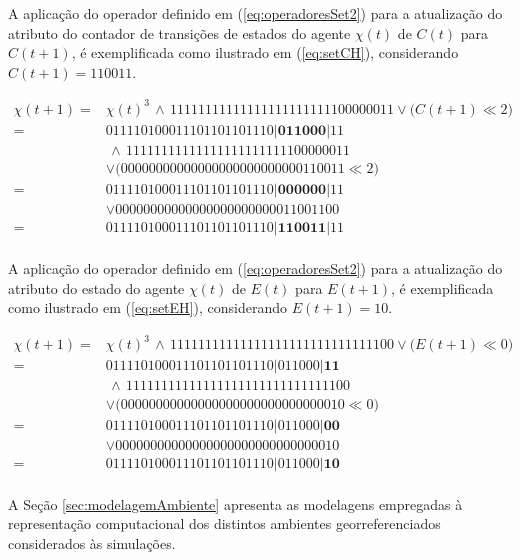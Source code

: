 A aplicação do operador definido em (\ref{eq:operadoresSet2}) para a atualização do atributo do contador de transições de estados do agente $\chi(t)$ de $C(t)$ para $C(t + 1)$, é exemplificada como ilustrado em (\ref{eq:setCH}), considerando $C(t + 1) = 1 1 0 0 1 1$.

\begin{equation}
 \begin{split}
 \chi(t + 1)   = & \chi(t)^3 \, \wedge \, 11111111111111111111111100000011 \vee \big(C(t + 1) \ll 2\big) \\
	       = & 0 1 1 1 1 0 1 0 0 0 1 1 1 0 1 1 0 1 1 0 1 1 1 0 | \boldsymbol{0 1 1 0 0 0} | 1 1 \\
	         & \, \wedge \, 11111111111111111111111100000011 \\
	         & \vee \big(00000000000000000000000000110011 \ll 2\big) \\
	       = & 0 1 1 1 1 0 1 0 0 0 1 1 1 0 1 1 0 1 1 0 1 1 1 0 | \boldsymbol{0 0 0 0 0 0} | 1 1 \\
	         & \vee 00000000000000000000000011001100 \\
	       = & 0 1 1 1 1 0 1 0 0 0 1 1 1 0 1 1 0 1 1 0 1 1 1 0 | \boldsymbol{1 1 0 0 1 1} | 1 1 \\
 \label{eq:setCH}
 \end{split}
\end{equation}

A aplicação do operador definido em (\ref{eq:operadoresSet2}) para a atualização do atributo do estado do agente $\chi(t)$ de $E(t)$ para $E(t + 1)$, é exemplificada como ilustrado em (\ref{eq:setEH}), considerando $E(t + 1) = 1 0$.

\begin{equation}
 \begin{split}
 \chi(t + 1)   = & \chi(t)^3 \, \wedge \, 11111111111111111111111111111100 \vee \big(E(t + 1) \ll 0\big) \\
	       = & 0 1 1 1 1 0 1 0 0 0 1 1 1 0 1 1 0 1 1 0 1 1 1 0 | 0 1 1 0 0 0 | \boldsymbol{1 1} \\
	         & \, \wedge \, 11111111111111111111111111111100 \\
	         & \vee \big(00000000000000000000000000000010 \ll 0\big) \\
	       = & 0 1 1 1 1 0 1 0 0 0 1 1 1 0 1 1 0 1 1 0 1 1 1 0 | 0 1 1 0 0 0 | \boldsymbol{0 0} \\
	         & \vee 00000000000000000000000000000010 \\
	       = & 0 1 1 1 1 0 1 0 0 0 1 1 1 0 1 1 0 1 1 0 1 1 1 0 | 0 1 1 0 0 0 | \boldsymbol{1 0} \\
 \label{eq:setEH}
 \end{split}
\end{equation}

\newpage

A Seção \ref{sec:modelagemAmbiente} apresenta as modelagens empregadas à representação computacional dos distintos ambientes georreferenciados considerados às simulações.

\newpage
